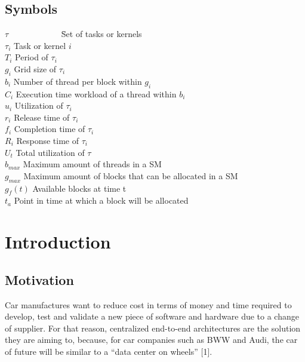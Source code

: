 \documentclass[
  12pt,
  a4paperpaper,
]{report}
\begin{document}
\hypertarget{symbols}{%
\section*{Symbols}\label{symbols}}

\begin{tabbing}
$\tau$~~~~~~~~~~~~ \= Set of tasks or kernels \\
$\tau_i$ \> Task or kernel $i$\\
$T_i$ \> Period of $\tau_i$ \\
$g_i$ \> Grid size of $\tau_i$ \\
$b_i$ \> Number of thread per block within $g_i$ \\
$C_i$ \> Execution time workload of a thread within $b_i$ \\
$u_i$ \> Utilization of $\tau_i$ \\
$r_i$ \> Release time of $\tau_i$ \\
$f_i$ \> Completion time of $\tau_i$ \\
$R_i$ \> Response time of $\tau_i$ \\
$U_t$ \> Total utilization of $\tau$ \\
$b_{max}$ \> Maximum amount of threads in a SM \\
$g_{max}$ \> Maximum amount of blocks that can be allocated in a SM \\
$g_f(t)$ \> Available blocks at  time t\\
$t_a$ \> Point in time at which a block will be allocated \\
\end{tabbing}

\newpage
\setcounter{page}{1}
\renewcommand{\thepage}{\arabic{page}}

\hypertarget{introduction}{%
\chapter{Introduction}\label{introduction}}

\hypertarget{motivation}{%
\section{Motivation}\label{motivation}}

Car manufactures want to reduce cost in terms of money and time required
to develop, test and validate a new piece of software and hardware due to a change of
supplier. For that reason, centralized end-to-end architectures are the
solution they are aiming to, because, for car companies such as BWW and
Audi, the car of future will be similar to a ``data center on wheels''
{[}1{]}.
\end{document}
